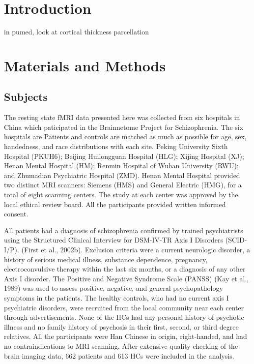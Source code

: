 \documentclass[preprint,authoryear,review,12pt]{elsarticle}
\begin{document}
\section*{Introduction}

in pumed, look at cortical thickness parcellation

\section*{Materials and Methods}

\subsection*{Subjects}

The resting state fMRI data presented here was collected from six hospitals in China which paticipated in the Brainnetome Project for Schizophrenia. The six hospitals are  Patients and controls are matched as much as possible for age, sex, handedness, and race distributions with each site. Peking University Sixth Hospital (PKUH6); Beijing Huilongguan Hospital (HLG); Xijing Hospital (XJ); Henan Mental Hospital (HM);  Renmin Hospital of Wuhan University (RWU); and Zhumadian Psychiatric Hospital (ZMD). Henan Mental Hospital provided two distinct MRI scanners: Siemens (HMS) and General Electric (HMG), for a total of eight scanning centers. The study at each center was approved by the local ethical review board. All the participants provided written informed consent.

 All patients had a diagnosis of schizophrenia confirmed by trained psychiatrists using the Structured Clinical Interview for DSM-IV-TR Axis I Disorders (SCID-I/P). (First et al., 2002b). Exclusion criteria were a current neurologic disorder, a history of serious medical illness, substance dependence, pregnancy, electroconvulsive therapy within the last six months, or a diagnosis of any other Axis I disorder. The Positive and Negative Syndrome Scale (PANSS)  (Kay et al., 1989) was used to assess positive, negative, and general psychopathology symptoms in the patients. The healthy controls, who had no current axis I psychiatric disorders, were recruited from the local community near each center through advertisements. None of the HCs had any personal history of psychotic illness and no family history of psychosis in their first, second, or third degree relatives. All the participants were Han Chinese in origin, right-handed, and had no contraindications to MRI scanning. After extensive quality checking of the brain imaging data, 662 patients and 613 HCs were included in the analysis.
 
\end{document}
